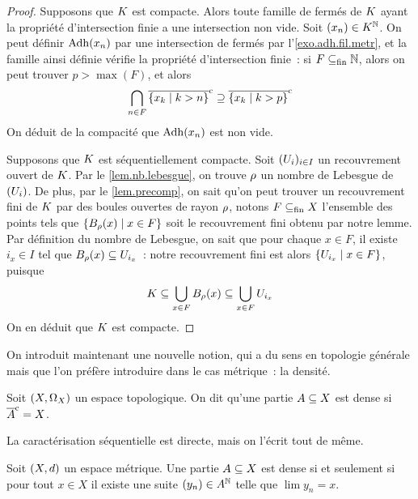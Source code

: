 \begin{proof}
  Supposons que $K$ est compacte. Alors toute famille de fermés de $K$
  ayant la propriété d'intersection finie a une intersection non vide. Soit
  $(x_n)\in K^{\mathbb N}$. On peut définir
  $\operatorname{Adh}(x_n)$ par une intersection de fermés par l'\cref{exo.adh.fil.metr}, et
  la famille ainsi définie vérifie la propriété d'intersection finie~: si
  $F\subseteq_{\mathrm{fin}} \mathbb N$, alors on peut trouver $p > \max(F)$, et alors
  \[\bigcap_{n \in F}\overline{\left\{ x_k \;\middle\vert\; k > n \right\}}^{\mathrm c} \supseteq
  \overline{\left\{ x_k \;\middle\vert\; k > p \right\}}^{\mathrm c}\]
  On déduit de la compacité que $\operatorname{Adh}(x_n)$ est non vide.
  
  Supposons que $K$ est séquentiellement compacte. Soit
  $(U_i)_{i\in I}$ un recouvrement ouvert de $K$. Par le
  \cref{lem.nb.lebesgue}, on trouve $\rho$ un nombre de Lebesgue de
  $(U_i)$. De plus, par le \cref{lem.precomp}, on sait qu'on peut trouver
  un recouvrement fini de $K$ par des boules ouvertes de rayon $\rho$,
  notons $F \subseteq_{\mathrm{fin}} X$ l'ensemble des points tels que
  $\left\{ B_{\rho}(x) \;\middle\vert\; x \in F \right\}$ soit le recouvrement fini obtenu par
  notre lemme. Par définition du nombre de Lebesgue, on sait que pour chaque
  $x \in F$, il
  existe $i_x \in I$ tel que $B_{\rho}(x) \subseteq U_{i_x}$~: notre
  recouvrement fini est alors $\left\{ U_{i_x} \;\middle\vert\; x \in F \right\}$, puisque
  \[K\subseteq \bigcup_{x \in F} B_{\rho}(x)\subseteq
  \bigcup_{x \in F} U_{i_x}\]
  On en déduit que $K$ est compacte.
\end{proof}

On introduit maintenant une nouvelle notion, qui a du sens en topologie générale
mais que l'on préfère introduire dans le cas métrique~: la densité.

\begin{definition}[Densité]
  Soit $(X,\Omega_{X})$ un espace topologique. On dit qu'une partie
  $A\subseteq X$ est dense si $\overline{A}^{\mathrm c} = X$.
\end{definition}

\noindent
La caractérisation séquentielle est directe, mais on l'écrit tout de même.

\begin{property}
  Soit $(X,d)$ un espace métrique. Une partie $A\subseteq X$ est
  dense si et seulement si pour tout $x\in X$ il existe une suite
  $(y_n)\in A^{\mathbb N}$ telle que $\lim y_n = x$.
\end{property}

